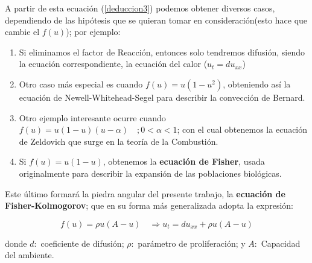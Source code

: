 A partir de esta ecuación (\ref{deduccion3}) podemos obtener diversos casos, dependiendo de las hipótesis que se quieran tomar en consideración(esto hace que cambie el $f(u)$); por ejemplo:
\begin{enumerate}
	\item Si eliminamos el factor de Reacción, entonces solo tendremos difusión, siendo la ecuación correspondiente, la ecuación del calor ($ { u }_{ t }=d{ u }_{ xx }$)
	
	\item Otro caso más especial es cuando $ f(u)=u(1-{ u }^{ 2 })$, obteniendo así la ecuación de Newell-Whitehead-Segel para describir la convección de Bernard.
	
	\item Otro ejemplo interesante ocurre cuando $ f(u)=u(1-{ u })(u-\alpha )\quad ;0<\alpha <1$; con el cual obtenemos la ecuación de Zeldovich que surge en la teoría de la Combustión.
	
	\item Si $f(u)=u(1-u) $, obtenemos la \textbf{ecuación de Fisher}, usada originalmente para describir la expansión de las poblaciones biológicas.
\end{enumerate}
Este último formará la piedra angular del presente trabajo, la \textbf{ecuación de Fisher-Kolmogorov}; que en su forma más generalizada adopta la expresión:

\begin{equation}
	\label{deduccion4}
	f(u)=\rho u(A-u)\quad \Rightarrow { u }_{ t }=d{ u }_{ xx }+\rho u(A-u)
\end{equation}

donde $d:$ coeficiente de difusión; $\rho: $ parámetro de proliferación; y $A:$ Capacidad del ambiente.\\

\begin{obs}
\end{obs}